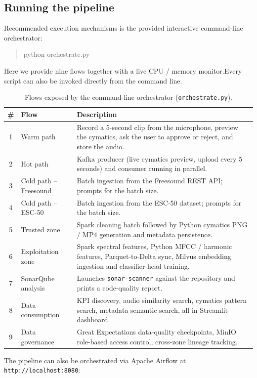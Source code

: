 \documentclass[11pt,a4paper]{article}
\begin{document}
\subsection{Running the pipeline}
Recommended execution mechanisms is the provided interactive command-line orchestrator:
\begin{quote}\small\ttfamily
python orchestrate.py
\end{quote}
Here we provide nine flows together with a live CPU / memory monitor.Every script can also be invoked directly from the command line.

\begin{table}[H]
\centering
\footnotesize
\renewcommand{\arraystretch}{1.15}
\begin{tabularx}{\textwidth}{@{}cp{4.0cm}X@{}}
\toprule
\textbf{\#} & \textbf{Flow} & \textbf{Description}\\
\midrule
1 & Warm path & Record a 5-second clip from the microphone, preview the cymatics, ask the user to approve or reject, and store the audio.\\
2 & Hot path & Kafka producer (live cymatics preview, upload every 5 seconds) and consumer running in parallel.\\
3 & Cold path -- Freesound & Batch ingestion from the Freesound REST API; prompts for the batch size.\\
4 & Cold path -- ESC-50 & Batch ingestion from the ESC-50 dataset; prompts for the batch size.\\
5 & Trusted zone & Spark cleaning batch followed by Python cymatics PNG / MP4 generation and metadata persistence.\\
6 & Exploitation zone & Spark spectral features, Python MFCC / harmonic features, Parquet-to-Delta sync, Milvus embedding ingestion and classifier-head training.\\
7 & SonarQube analysis & Launches \texttt{sonar-scanner} against the repository and prints a code-quality report.\\
8 & Data consumption & KPI discovery, audio similarity search, cymatics pattern search, metadata semantic search, all in Streamlit dashboard.\\
9 & Data governance & Great Expectations data-quality checkpoints, MinIO role-based access control, cross-zone lineage tracking.\\
\bottomrule
\end{tabularx}
\caption{Flows exposed by the command-line orchestrator (\texttt{orchestrate.py}).}
\label{tab:orchestrator}
\end{table}
\thispagestyle{empty}
The pipeline can also be orchestrated via Apache Airflow at \texttt{http://localhost:8080}:
\end{document}
